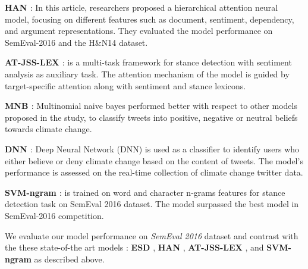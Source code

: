 \documentclass[letterpaper]{article}
\begin{document}
\par\noindent\textbf{HAN \cite{wang2020neural}}: In this article, researchers proposed a hierarchical attention neural model, focusing on different features such as document, sentiment, dependency, and argument representations. They evaluated the model performance on SemEval-2016 and the H\&N14 dataset.

\par\noindent\textbf{AT-JSS-LEX \cite{li2019multi}}: is a multi-task framework for stance detection with sentiment analysis as auxiliary task. The attention mechanism of the model is guided by target-specific attention along with sentiment and stance lexicons.

\par\noindent\textbf{MNB \cite{kabaghe66classifying}}: Multinomial naive bayes performed better with respect to other models proposed in the study, to classify tweets into positive, negative or neutral beliefs towards climate change.

\par\noindent\textbf{DNN \cite{chen2019detecting}}: Deep Neural Network (DNN) is used as a classifier to identify users who either believe or deny climate change based on the content of tweets. The model's performance is assessed on the real-time collection of climate change twitter data.
\par\noindent\textbf{SVM-ngram \cite{sobhani2016detecting}}: is trained on word and character n-grams features for stance detection task on SemEval 2016 dataset. The model surpassed the best model in SemEval-2016 competition.

\par\noindent We evaluate our model performance on \textit{SemEval 2016} dataset and contrast with the these state-of-the art models :  \textbf{ESD} \cite{vychegzhanin2021new}, \textbf{HAN} \cite{wang2020neural}, \textbf{AT-JSS-LEX} \cite{li2019multi}, and \textbf{SVM-ngram} \cite{sobhani2016detecting} as described above.
\end{document}
